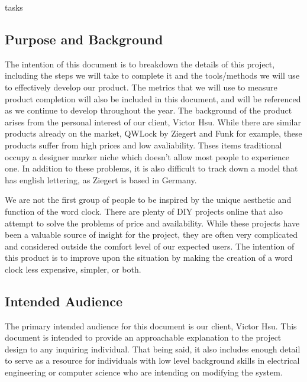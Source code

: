tasks\documentclass[onecolumn, draftclsnofoot,10pt, compsoc]{IEEEtran}
\begin{document}
\subsection{Purpose and Background}
The intention of this document is to breakdown the details of this project, including the steps we will take to complete it and the tools/methods we will use to effectively develop our product.
The metrics that we will use to measure product completion will also be included in this document, and will be referenced as we continue to develop throughout the year.
The background of the product arises from the personal interest of our client, Victor Hsu.
While there are similar products already on the market, QWLock by Ziegert and Funk for example, these products suffer from high prices and low avaliability.
Thses items traditional occupy a designer marker niche which doesn't allow most people to experience one.
In addition to these problems, it is also difficult to track down a model that has english lettering, as Ziegert is based in Germany.

We are not the first group of people to be inspired by the unique aesthetic and function of the word clock.
There are plenty of DIY projects online that also attempt to solve the problems of price and availability.
While these projects have been a valuable source of insight for the project, they are often very complicated and considered outside the comfort level of our expected users.
The intention of this product is to improve upon the situation by making the creation of a word clock less expensive, simpler, or both.

\subsection{Intended Audience}
The primary intended audience for this document is our client, Victor Hsu.
This document is intended to provide an approachable explanation to the project design to any inquiring individual.
That being said, it also includes enough detail to serve as a resource for individuals with low level background skills in electrical engineering or computer science who are intending on modifying the system.
\end{document}
